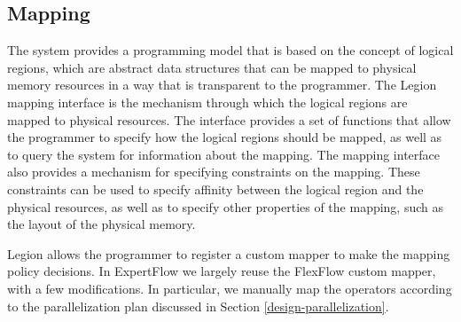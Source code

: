 \subsection{Mapping}
The system provides a programming model that is based on the concept of logical regions, which are abstract data structures that can be mapped to physical memory resources in a way that is transparent to the programmer. The Legion mapping interface is the mechanism through which the logical regions are mapped to physical resources. The interface provides a set of functions that allow the programmer to specify how the logical regions should be mapped, as well as to query the system for information about the mapping. The mapping interface also provides a mechanism for specifying constraints on the mapping. These constraints can be used to specify affinity between the logical region and the physical resources, as well as to specify other properties of the mapping, such as the layout of the physical memory.

Legion allows the programmer to register a custom mapper to make the mapping policy decisions. In ExpertFlow we largely reuse the FlexFlow custom mapper, with a few modifications. In particular, we manually map the operators according to the parallelization plan discussed in Section \ref{design-parallelization}.


